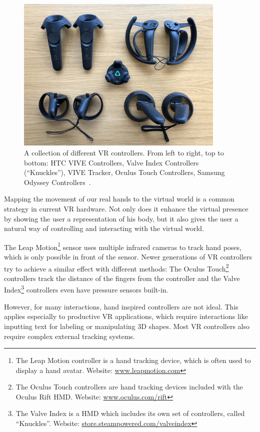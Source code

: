 \begin{figure}[H]%
	\centering%
	\includegraphics[width=10cm]{figures/introduction/vr_controllers.jpg}%
	\caption[Collection of VR controllers]{A collection of different \ac{VR} controllers. From left to right, top to bottom: HTC VIVE Controllers, Valve Index Controllers (\enquote{Knuckles}), VIVE Tracker, Oculus Touch Controllers, Samsung Odyssey Controllers~\cite{Yang.2018}.}\label{fig:vr-controllers}
\end{figure}

Mapping the movement of our real hands to the virtual world is a common strategy in current \ac{VR} hardware. Not only does it enhance the virtual presence by showing the user a representation of his body, but it also gives the user a natural way of controlling and interacting with the virtual world.

The Leap Motion\footnote{The Leap Motion controller is a hand tracking device, which is often used to display a hand avatar. Website: \href{https://www.leapmotion.com/}{www.leapmotion.com}} sensor uses multiple infrared cameras to track hand poses, which is only possible in front of the sensor. Newer generations of \ac{VR} controllers try to achieve a similar effect with different methods: The Oculus Touch\footnote{The Oculus Touch controllers are hand tracking devices included with the Oculus Rift \ac{HMD}. Website: \href{https://www.oculus.com/rift/}{www.oculus.com/rift}} controllers track the distance of the fingers from the controller and the Valve Index\footnote{The Valve Index is a \ac{HMD} which includes its own set of controllers, called \enquote{Knuckles}. Website: \href{https://store.steampowered.com/valveindex}{store.steampowered.com/valveindex}} controllers even have pressure sensors built-in.

However, for many interactions, hand inspired controllers are not ideal. This applies especially to productive \ac{VR} applications, which require interactions like inputting text for labeling or manipulating \ac{3D} shapes. Most \ac{VR} controllers also require complex external tracking systems.

